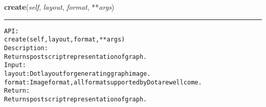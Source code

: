     \label{coinor:gimpy:graph:Graph:create}

    \vspace{0.5ex}

\hspace{.8\funcindent}\begin{boxedminipage}{\funcwidth}

    \raggedright \textbf{create}(\textit{self}, \textit{layout}, \textit{format}, **\textit{args})

    \vspace{-1.5ex}

    \rule{\textwidth}{0.5\fboxrule}
\setlength{\parskip}{2ex}
\begin{alltt}

API:
    create(self, layout, format, **args)
Description:
    Returns postscript representation of graph.
Input:
    layout: Dot layout for generating graph image.
    format: Image format, all format supported by Dot are wellcome.
Return:
    Returns postscript representation of graph.
\end{alltt}

\setlength{\parskip}{1ex}
    \end{boxedminipage}

    \label{coinor:gimpy:graph:Graph:display}

    \vspace{0.5ex}

